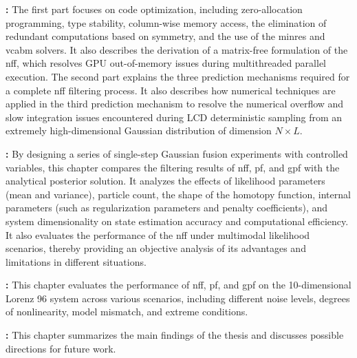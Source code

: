 \textbf{: } The first part focuses on code optimization, including zero-allocation programming, type stability, column-wise memory access\cite{JULIA}, the elimination of redundant computations based on symmetry, and the use of the \ac{minres} and \ac{vcabm} solvers\cite{NME}. It also describes the derivation of a matrix-free formulation of the \ac{nff}, which resolves GPU out-of-memory issues during multithreaded parallel execution. The second part explains the three prediction mechanisms required for a complete \ac{nff} filtering process. It also describes how numerical techniques are applied in the third prediction mechanism to resolve the numerical overflow and slow integration issues encountered during LCD deterministic sampling from an extremely high-dimensional Gaussian distribution of dimension $N \times L$.

\textbf{: } By designing a series of single-step Gaussian fusion experiments with controlled variables, this chapter compares the filtering results of \ac{nff}, \ac{pf}, and \ac{gpf} with the analytical posterior solution. It analyzes the effects of likelihood parameters (mean and variance), particle count, the shape of the homotopy function, internal parameters (such as regularization parameters and penalty coefficients), and system dimensionality on state estimation accuracy and computational efficiency. It also evaluates the performance of the \ac{nff} under multimodal likelihood scenarios, thereby providing an objective analysis of its advantages and limitations in different situations.

\textbf{: } This chapter evaluates the performance of \ac{nff}, \ac{pf}, and \ac{gpf} on the 10-dimensional Lorenz 96 system across various scenarios, including different noise levels, degrees of nonlinearity, model mismatch, and extreme conditions.

\textbf{: } This chapter summarizes the main findings of the thesis and discusses possible directions for future work.